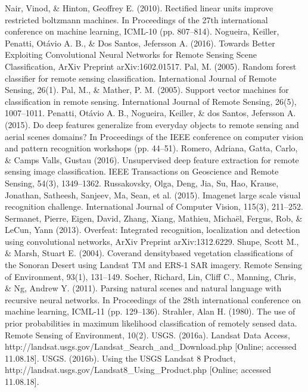 \documentclass[letterpaper, 10 pt, conference]{ieeeconf}  %
\begin{document}
\begin{thebibliography}{99}
Nair, Vinod, \& Hinton, Geoffrey E. (2010). Rectified linear units improve restricted boltzmann machines. In Proceedings of the 27th international conference on machine learning, ICML-10 (pp. 807–814).
Nogueira, Keiller, Penatti, Otávio A. B., \& Dos Santos, Jefersson A. (2016). Towards Better Exploiting Convolutional Neural Networks for Remote Sensing Scene Classification, ArXiv Preprint arXiv:1602.01517.
Pal, M. (2005). Random forest classifier for remote sensing classification. International Journal of Remote Sensing, 26(1).
Pal, M., \& Mather, P. M. (2005). Support vector machines for classification in remote sensing. International Journal of Remote Sensing, 26(5), 1007–1011.
Penatti, Otávio A. B., Nogueira, Keiller, \& dos Santos, Jefersson A. (2015). Do deep features generalize from everyday objects to remote sensing and aerial scenes domains? In Proceedings of the IEEE conference on computer vision and pattern recognition workshops (pp. 44–51).
Romero, Adriana, Gatta, Carlo, \& Camps Valls, Gustau (2016). Unsupervised deep feature extraction for remote sensing image classification. IEEE Transactions on Geoscience and Remote Sensing, 54(3), 1349–1362.
Russakovsky, Olga, Deng, Jia, Su, Hao, Krause, Jonathan, Satheesh, Sanjeev, Ma, Sean, et al. (2015). Imagenet large scale visual recognition challenge. International Journal of Computer Vision, 115(3), 211–252.
Sermanet, Pierre, Eigen, David, Zhang, Xiang, Mathieu, Michaël, Fergus, Rob, \& LeCun, Yann (2013). Overfeat: Integrated recognition, localization and detection using convolutional networks, ArXiv Preprint arXiv:1312.6229.
Shupe, Scott M., \& Marsh, Stuart E. (2004). Coverand densitybased vegetation classifications of the Sonoran Desert using Landsat TM and ERS-1 SAR imagery. Remote Sensing of Environment, 93(1), 131–149.
Socher, Richard, Lin, Cliff C., Manning, Chris, \& Ng, Andrew Y. (2011). Parsing natural scenes and natural language with recursive neural networks. In Proceedings of the 28th international conference on machine learning, ICML-11 (pp. 129–136).
Strahler, Alan H. (1980). The use of prior probabilities in maximum likelihood classification of remotely sensed data. Remote Sensing of Environment, 10(2).
USGS. (2016a). Landsat Data Access, http://landsat.usgs.gov/Landsat\_Search\_and\_Download.php [Online; accessed 11.08.18].
USGS. (2016b). Using the USGS Landsat 8 Product, http://landsat.usgs.gov/Landsat8\_Using\_Product.php [Online; accessed 11.08.18].

\end{thebibliography}
\end{document}
